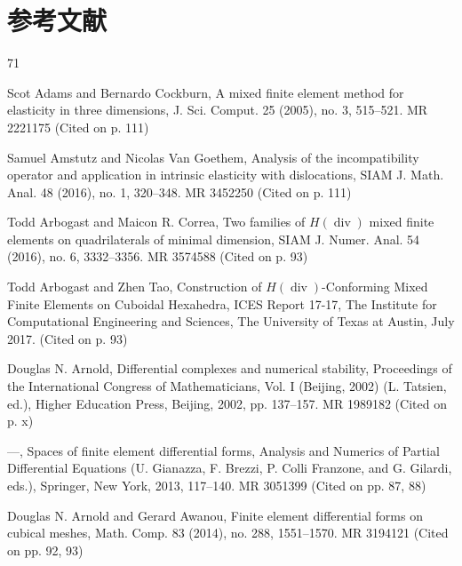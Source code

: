\clearpage\chapter*{参考文献}\label{back:bibliography}
\begin{MBSourceBibliography}{71}

\item\label{bib:source-1}Scot Adams and Bernardo Cockburn, A mixed finite element method for elasticity in three dimensions, J. Sci. Comput. 25 (2005), no. 3, 515–521. MR 2221175 (Cited on p. 111)

\item\label{bib:source-2}Samuel Amstutz and Nicolas Van Goethem, Analysis of the incompatibility operator and application in intrinsic elasticity with dislocations, SIAM J. Math. Anal. 48 (2016), no. 1, 320–348. MR 3452250 (Cited on p. 111)

\item\label{bib:source-3}Todd Arbogast and Maicon R. Correa, Two families of $H(\operatorname{div})$ mixed finite elements on quadrilaterals of minimal dimension, SIAM J. Numer. Anal. 54 (2016), no. 6, 3332–3356. MR 3574588 (Cited on p. 93)

\item\label{bib:source-4}Todd Arbogast and Zhen Tao, Construction of $H(\operatorname{div})$-Conforming Mixed Finite Elements on Cuboidal Hexahedra, ICES Report 17-17, The Institute for Computational Engineering and Sciences, The University of Texas at Austin, July 2017. (Cited on p. 93)

\item\label{bib:source-5}Douglas N. Arnold, Differential complexes and numerical stability, Proceedings of the International Congress of Mathematicians, Vol. I (Beijing, 2002) (L. Tatsien, ed.), Higher Education Press, Beijing, 2002, pp. 137–157. MR 1989182 (Cited on p. x)

\item\label{bib:source-6}—, Spaces of finite element differential forms, Analysis and Numerics of Partial Differential Equations (U. Gianazza, F. Brezzi, P. Colli Franzone, and G. Gilardi, eds.), Springer, New York, 2013, 117–140. MR 3051399 (Cited on pp. 87, 88)

\item\label{bib:source-7}Douglas N. Arnold and Gerard Awanou, Finite element differential forms on cubical meshes, Math. Comp. 83 (2014), no. 288, 1551–1570. MR 3194121 (Cited on pp. 92, 93)


\end{MBSourceBibliography}
